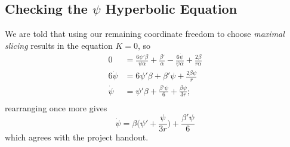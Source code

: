 \documentclass[12pt]{article}
\numberwithin{equation}{section}
\begin{document}

\subsection{Checking the $\psi$ Hyperbolic Equation}
We are told that using our remaining coordinate freedom to choose \textit{maximal slicing} results in the equation $K = 0$, so
\begin{equation}
\begin{aligned}
0 &= \frac{6 \psi' \beta}{\psi \alpha} + \frac{\beta'}{\alpha} - \frac{6 \dot{\psi}}{\psi \alpha} + \frac{2 \beta}{r \alpha} \\
6 \dot{\psi} &= 6 \psi' \beta + \beta' \psi + \frac{2 \beta \psi}{r} \\
\dot{\psi} &= \psi' \beta + \frac{\beta' \psi}{6} + \frac{\beta \psi}{3 r}; \\
\end{aligned}
\end{equation}
rearranging once more gives
\begin{equation}
\boxed{\dot{\psi} = \beta \Big(\psi' + \frac{\psi}{3 r} \Big) + \frac{\beta' \psi}{6} }
\end{equation}
which agrees with the project handout.
\end{document}
